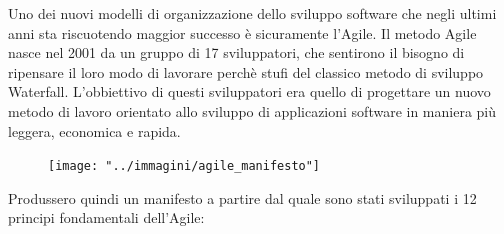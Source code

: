 Uno dei nuovi modelli di organizzazione dello sviluppo software che negli ultimi anni sta riscuotendo maggior successo è sicuramente l’Agile. Il metodo Agile nasce nel 2001 da un gruppo di 17 sviluppatori, che sentirono il bisogno di ripensare il loro modo di lavorare perchè stufi del classico metodo di sviluppo Waterfall. 
L'obbiettivo di questi sviluppatori era quello di progettare un nuovo metodo di lavoro orientato allo sviluppo di applicazioni software in maniera più leggera, economica e rapida. 




\begin{figure}[h!]
	\centering
	\texttt{[image: "../immagini/agile\_manifesto"]}
\end{figure}

Produssero quindi un manifesto a partire dal quale sono stati sviluppati i 12 principi fondamentali dell'Agile:

